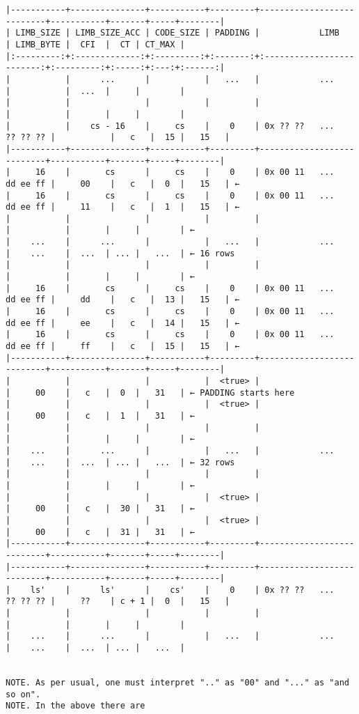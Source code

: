 \documentclass[varwidth=\maxdimen,margin=0.5cm,multi={verbatim}]{standalone}
\begin{document}
\begin{verbatim}
|-----------+---------------+-----------+---------+---------------------------+-----------+-------+-----+--------|
| LIMB_SIZE | LIMB_SIZE_ACC | CODE_SIZE | PADDING |            LIMB           | LIMB_BYTE |  CFI  |  CT | CT_MAX |
|:---------:+:-------------:+:---------:+:-------:+:-------------------------:+:---------:+:-----:+:---:+:------:|
|           |      ...      |           |   ...   |            ...            |           |  ...  |     |        |
|           |               |           |         |                           |           |       |     |        |
|           |    cs - 16    |     cs    |    0    | 0x ?? ??   ...   ?? ?? ?? |           |   c   |  15 |   15   |
|-----------+---------------+-----------+---------+---------------------------+-----------+-------+-----+--------|
|     16    |       cs      |     cs    |    0    | 0x 00 11   ...   dd ee ff |     00    |   c   |  0  |   15   | ←
|     16    |       cs      |     cs    |    0    | 0x 00 11   ...   dd ee ff |     11    |   c   |  1  |   15   | ←
|           |               |           |         |                           |           |       |     |        | ←
|    ...    |      ...      |           |   ...   |            ...            |    ...    |  ...  | ... |   ...  | ← 16 rows
|           |               |           |         |                           |           |       |     |        | ←
|     16    |       cs      |     cs    |    0    | 0x 00 11   ...   dd ee ff |     dd    |   c   |  13 |   15   | ←
|     16    |       cs      |     cs    |    0    | 0x 00 11   ...   dd ee ff |     ee    |   c   |  14 |   15   | ←
|     16    |       cs      |     cs    |    0    | 0x 00 11   ...   dd ee ff |     ff    |   c   |  15 |   15   | ←
|-----------+---------------+-----------+---------+---------------------------+-----------+-------+-----+--------|
|           |               |           |  <true> |                           |     00    |   c   |  0  |   31   | ← PADDING starts here
|           |               |           |  <true> |                           |     00    |   c   |  1  |   31   | ←
|           |               |           |         |                           |           |       |     |        | ←
|    ...    |      ...      |           |   ...   |            ...            |    ...    |  ...  | ... |   ...  | ← 32 rows
|           |               |           |         |                           |           |       |     |        | ←
|           |               |           |  <true> |                           |     00    |   c   |  30 |   31   | ←
|           |               |           |  <true> |                           |     00    |   c   |  31 |   31   | ←
|-----------+---------------+-----------+---------+---------------------------+-----------+-------+-----+--------|
|-----------+---------------+-----------+---------+---------------------------+-----------+-------+-----+--------|
|    ls'    |      ls'      |    cs'    |    0    | 0x ?? ??   ...   ?? ?? ?? |     ??    | c + 1 |  0  |   15   |
|           |               |           |         |                           |           |       |     |        |
|    ...    |      ...      |           |   ...   |            ...            |    ...    |  ...  | ... |   ...  |


NOTE. As per usual, one must interpret ".." as "00" and "..." as "and so on".
NOTE. In the above there are
\end{verbatim}
\end{document}
